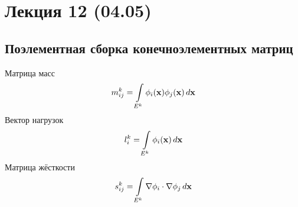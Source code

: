 \section{Лекция 12 (04.05)}
\subsection{Поэлементная сборка конечноэлементных матриц}
Матрица масс
\begin{equation}
\label{eq:fem_mass_matrix}
m^k_{ij} = \arint{\phi_i(\vec x) \phi_j(\vec x)}{E^k}{\vec x}
\end{equation}
Вектор нагрузок
\begin{equation}
\label{eq:fem_load_vector}
l^k_{i} = \arint{\phi_i(\vec x)}{E^k}{\vec x}
\end{equation}
Матрица жёсткости
\begin{equation}
\label{eq:fem_stiff_matrix}
s^k_{ij} = \arint{\nabla \phi_i \cdot \nabla \phi_j}{E^k}{\vec x}
\end{equation}
